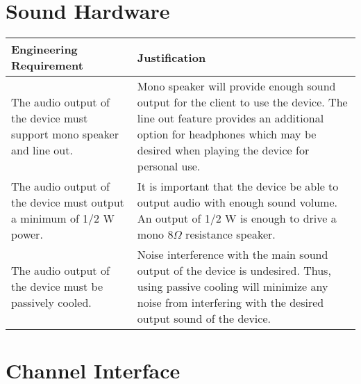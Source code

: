\documentclass{article}
\begin{document}
\section{Sound Hardware}

\begin{tabular}{|p{3in}|p{3in}|}
\hline
Engineering Requirement & Justification \\
\hline
The audio output of the device must support mono speaker and line out.&Mono speaker will provide enough sound output for the client to use the device.  The line out feature provides an additional option for headphones which may be desired when playing the device for personal use.\\
\hline
The audio output of the device must output a minimum of 1/2 W power.&It is important that the device be able to output audio with enough sound volume.  An output of 1/2 W is enough to drive a mono 8${\Omega}$ resistance speaker.\\
\hline
The audio output of the device must be passively cooled.&Noise interference with the main sound output of the device is undesired.  Thus, using passive cooling will minimize any noise from interfering with the desired output sound of the device.\\
\hline
\end{tabular}


\section{Channel Interface}
\end{document}
